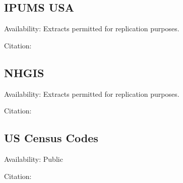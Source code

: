\documentclass{article}
\begin{document}
\subsection{IPUMS USA}
Availability: Extracts permitted for replication purposes.

Citation: 

\subsection{NHGIS}
Availability: Extracts permitted for replication purposes.

Citation: 

\subsection{US Census Codes}
Availability: Public

Citation: 






\end{document}
